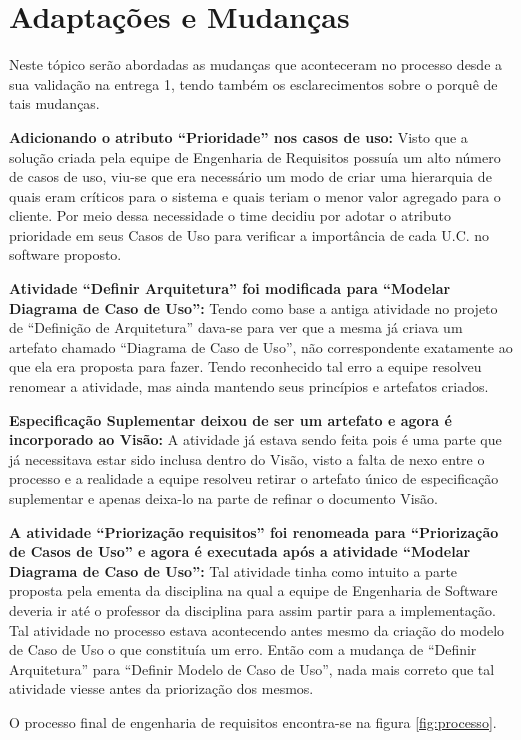 \chapter{Adaptações e Mudanças}

Neste tópico serão abordadas as mudanças que aconteceram no processo desde a sua validação na entrega 1, tendo também os esclarecimentos sobre o porquê de tais mudanças.

  \textbf{Adicionando o atributo ``Prioridade'' nos casos de uso:} Visto que a solução criada pela equipe de Engenharia de Requisitos possuía um alto número de casos de uso, viu-se que era necessário um modo de criar uma hierarquia de quais eram críticos para o sistema e quais teriam o menor valor agregado para o cliente. Por meio dessa necessidade o time decidiu por adotar o atributo prioridade em seus Casos de Uso para verificar a importância de cada U.C. no software proposto.

  \textbf{Atividade ``Definir Arquitetura'' foi modificada para ``Modelar Diagrama de Caso de Uso'':}
  Tendo como base a antiga atividade no projeto de ``Definição de Arquitetura'' dava-se para ver que a mesma já criava um artefato chamado ``Diagrama de Caso de Uso'', não correspondente exatamente ao que ela era proposta para fazer. Tendo reconhecido tal erro a equipe resolveu renomear a atividade, mas ainda mantendo seus princípios e artefatos criados.

  \textbf{Especificação Suplementar deixou de ser um artefato e agora é incorporado ao Visão:} A atividade já estava sendo feita pois é uma parte que já necessitava estar sido inclusa dentro do Visão, visto a falta de nexo entre o processo e a realidade a equipe resolveu retirar o artefato único de especificação suplementar e apenas deixa-lo na parte de refinar o documento Visão.

  \textbf{A atividade “Priorização requisitos” foi renomeada para ``Priorização de Casos de Uso'' e agora é executada após a atividade ``Modelar Diagrama de Caso de Uso'':} Tal atividade tinha como intuito a parte proposta pela ementa da disciplina na qual a equipe de Engenharia de Software deveria ir até o professor da disciplina para assim partir para a implementação. Tal atividade no processo estava acontecendo antes mesmo da criação do modelo de Caso de Uso o que constituía um erro. Então com a mudança de ``Definir Arquitetura'' para ``Definir Modelo de Caso de Uso'', nada mais correto que tal atividade viesse antes da priorização dos mesmos.

  O processo final de engenharia de requisitos encontra-se na figura \ref{fig:processo}.

